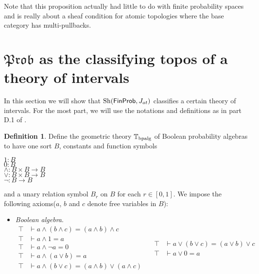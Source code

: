 \documentclass[a4paper]{amsproc}
\theoremstyle{plain}
\theoremstyle{definition}
\newtheorem{definition}[theorem]{Definition}
\theoremstyle{remark}
\numberwithin{equation}{section}
\DeclareMathOperator{\Sh}{Sh}
\newcommand{\FinProb}{\textup{\textsf{FinProb}}}
\newcommand{\Prob}{\mathfrak{Prob}}
\begin{document}
Note that this proposition actually had little to do with finite probability spaces and is really about a sheaf condition for atomic topologies where the base category has multi-pullbacks.


\section{$\Prob$ as the classifying topos of a theory of intervals}\label{section_classifying}

In this section we will show that $\Sh(\FinProb, J_{at})$ classifies a certain theory of intervals. For the most part, we will use the notations and definitions as in part D.1 of \cite{johnstone2002sketches2}.

\begin{definition}
    Define the geometric theory $\mathbb{T}_{\textup{bpalg}}$ of Boolean probability algebras to have one sort $B$, constants and function symbols
    \begin{center}
        $1: B$ \\
        $0: B$ \\
        $\wedge: B \times B \to B$ \\
        $\vee: B \times B \to B$ \\
        $\neg: B \to B$
    \end{center}
    and a unary relation symbol $B_r$ on $B$ for each $r \in [0,1]$. We impose the following axioms($a$, $b$ and $c$ denote free variables in $B$):
    \begin{itemize}
        \item \textit{Boolean algebra}.
        \begin{equation*}
            \begin{split}
                \top &\vdash a \wedge (b \wedge c) = (a \wedge b) \wedge c \\
                \top &\vdash a \wedge 1 = a \\
                \top &\vdash a \wedge \neg{a} = 0 \\
                \top &\vdash a \wedge (a \vee b) = a \\
                \top &\vdash a \wedge (b \vee c) = (a \wedge b) \vee (a \wedge c) \\
            \end{split}
            \quad
            \begin{split}
                \top &\vdash a \vee (b \vee c) = (a \vee b) \vee c \\
                \top &\vdash a \vee 0 = a \\

\end{split}
\end{equation*}
\end{itemize}
\end{definition}
\end{document}
